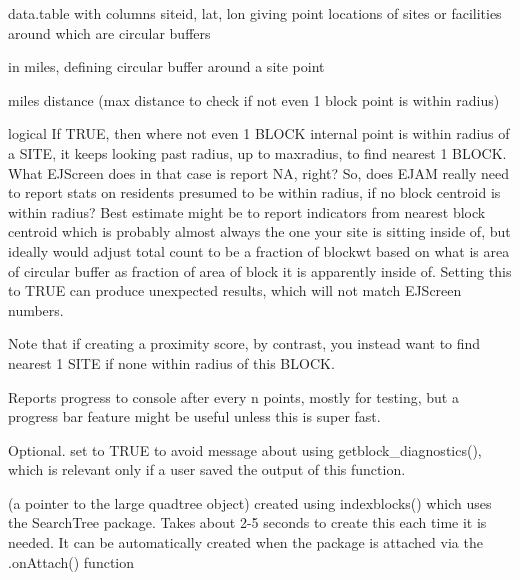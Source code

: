 \documentclass[a4paper]{book}
\begin{document}
\begin{Arguments}
\begin{ldescription}
\item[\code{sitepoints}] data.table with columns siteid, lat, lon giving point locations of sites or facilities around which are circular buffers

\item[\code{radius}] in miles, defining circular buffer around a site point

\item[\code{maxradius}] miles distance (max distance to check if not even 1 block point is within radius)

\item[\code{avoidorphans}] logical If TRUE, then where not even 1 BLOCK internal point is within radius of a SITE,
it keeps looking past radius, up to maxradius, to find nearest 1 BLOCK.
What EJScreen does in that case is report NA, right? So,
does EJAM really need to report stats on residents presumed to be within radius,
if no block centroid is within radius?
Best estimate might be to report indicators from nearest block centroid which is
probably almost always the one your site is sitting inside of,
but ideally would adjust total count to be a fraction of blockwt based on
what is area of circular buffer as fraction of area of block it is apparently inside of.
Setting this to TRUE can produce unexpected results, which will not match EJScreen numbers.

Note that if creating a proximity score, by contrast, you instead want to find nearest 1 SITE if none within radius of this BLOCK.

\item[\code{report\_progress\_every\_n}] Reports progress to console after every n points,
mostly for testing, but a progress bar feature might be useful unless this is super fast.

\item[\code{quiet}] Optional. set to TRUE to avoid message about using getblock\_diagnostics(),
which is relevant only if a user saved the output of this function.

\item[\code{quadtree}] (a pointer to the large quadtree object)
created using indexblocks() which uses the SearchTree package.
Takes about 2-5 seconds to create this each time it is needed.
It can be automatically created when the package is attached via the .onAttach() function
\end{ldescription}
\end{Arguments}
\end{document}

